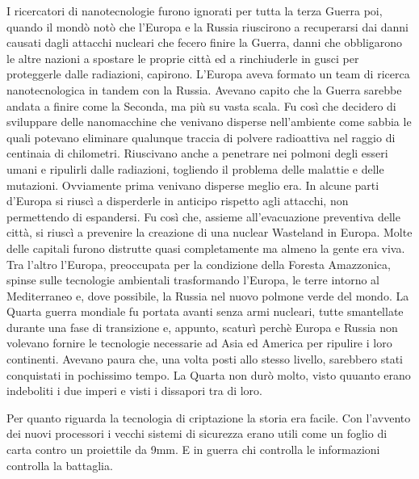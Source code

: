     I ricercatori di nanotecnologie furono ignorati per tutta la terza Guerra poi, quando il mondò notò che l'Europa e
    la Russia riuscirono a recuperarsi dai danni causati dagli attacchi nucleari che fecero finire la Guerra, danni che
    obbligarono le altre nazioni a spostare le proprie città ed a rinchiuderle in gusci per proteggerle dalle
    radiazioni, capirono. L'Europa aveva formato un team di ricerca nanotecnologica in tandem con la Russia. Avevano
    capito che la Guerra sarebbe andata a finire come la Seconda, ma più su vasta scala. Fu così che decidero di
    sviluppare delle nanomacchine che venivano disperse nell'ambiente come sabbia le quali potevano eliminare qualunque
    traccia di polvere radioattiva nel raggio di centinaia di chilometri. Riuscivano anche a penetrare nei polmoni degli
    esseri umani e ripulirli dalle radiazioni, togliendo il problema delle malattie e delle mutazioni. Ovviamente prima
    venivano disperse meglio era. In alcune parti d'Europa si riuscì a disperderle in anticipo rispetto agli attacchi,
    non permettendo di espandersi. Fu così che, assieme all'evacuazione preventiva delle città, si riuscì a prevenire la
    creazione di una nuclear Wasteland in Europa. Molte delle capitali furono distrutte quasi completamente ma almeno la
    gente era viva. Tra l'altro l'Europa, preoccupata per la condizione della Foresta Amazzonica, spinse sulle
    tecnologie ambientali trasformando l'Europa, le terre intorno al Mediterraneo e, dove possibile, la Russia nel nuovo
    polmone verde del mondo. La Quarta guerra mondiale fu portata avanti senza armi nucleari, tutte smantellate durante
    una fase di transizione e, appunto, scaturì perchè Europa e Russia non volevano fornire le tecnologie necessarie ad
    Asia ed America per ripulire i loro continenti. Avevano paura che, una volta posti allo stesso livello, sarebbero
    stati conquistati in pochissimo tempo. La Quarta non durò molto, visto quuanto erano indeboliti i due imperi e visti
    i dissapori tra di loro.

    Per quanto riguarda la tecnologia di criptazione la storia era facile. Con l'avvento dei nuovi processori i vecchi
    sistemi di sicurezza erano utili come un foglio di carta contro un proiettile da 9mm. E in guerra chi controlla le
    informazioni controlla la battaglia.

